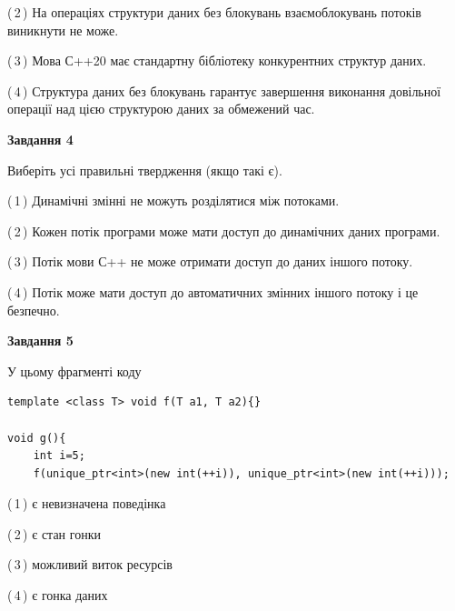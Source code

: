\documentclass[12pt, ukrainian]{article}
\begin{document}
\begin {large}
{(\,2\,) На операціях структури даних без блокувань взаємоблокувань потоків виникнути не може.%

(\,3\,) Мова С++20 має стандартну бібліотеку конкурентних структур даних.%

(\,4\,) Структура даних без блокувань гарантує завершення виконання довільної операції над цією структурою даних за обмежений час.%



\begin{center}
\textbf{Завдання 4}
\end{center}
Виберіть усі правильні твердження (якщо такі є).\par
\vspace{2mm}

(\,1\,) Динамічні змінні не можуть розділятися між потоками.%

(\,2\,) Кожен потік програми може мати доступ до динамічних даних програми.%

(\,3\,) Потік мови С++ не може отримати доступ до даних іншого потоку.%

(\,4\,) Потік може мати доступ до автоматичних змінних іншого потоку і це безпечно.%



\begin{center}
\textbf{Завдання 5}
\end{center}
У цьому фрагменті коду
\begin{verbatim}
template <class T> void f(T a1, T a2){}

void g(){
    int i=5;
    f(unique_ptr<int>(new int(++i)), unique_ptr<int>(new int(++i)));
\end{verbatim}

(\,1\,) є невизначена поведінка%

(\,2\,) є стан гонки%

(\,3\,) можливий виток ресурсів%

(\,4\,) є гонка даних%


}
\end {large}
\end{document}
